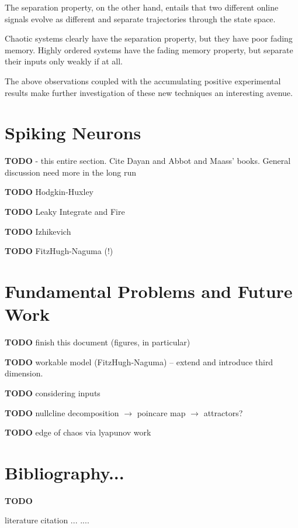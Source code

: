 \documentclass{elsart}
\begin{document}
    The separation property, on the other hand, entails that two different
    online signals evolve as different and separate trajectories through
    the state space.

    Chaotic systems clearly have the separation property, but they have poor
    fading memory.  Highly ordered systems have the fading memory property, 
    but separate their inputs only weakly if at all.

    The above observations coupled with the accumulating positive 
    experimental results make further investigation of these new 
    techniques an interesting avenue.

\section{Spiking Neurons}
\textbf{ TODO } - this entire section.  Cite Dayan and Abbot and Maass' books.
General discussion
  need more in the long run

\textbf{TODO}
Hodgkin-Huxley

\textbf{TODO}
Leaky Integrate and Fire

\textbf{TODO}
Izhikevich

\textbf{TODO}
FitzHugh-Naguma (!)
\section{Fundamental Problems and Future Work}
\textbf{TODO}
finish this document (figures, in particular)

\textbf{TODO}
workable model (FitzHugh-Naguma) -- extend and introduce third dimension.

\textbf{TODO}
considering inputs

\textbf{TODO}
nullcline decomposition $\rightarrow$ poincare map $\rightarrow$ attractors?

\textbf{TODO}
edge of chaos via lyapunov work

\section{Bibliography...}
\textbf{TODO}
 \begin{thebibliography}{widest-label}
   literature citation ...
    ....
     \end{thebibliography}
  
\end{document}
